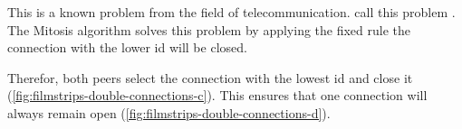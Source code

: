 This is a known problem from the field of telecommunication. \citet[pp. 194-194]{signaling-systems-book} call this problem .
The Mitosis algorithm solves this problem by applying the fixed rule the connection with the lower id will be closed.

Therefor, both peers select the connection with the lowest id and close it (\vref{fig:filmstrips-double-connections-c}). 
This ensures that one connection will always remain open (\vref{fig:filmstrips-double-connections-d}).